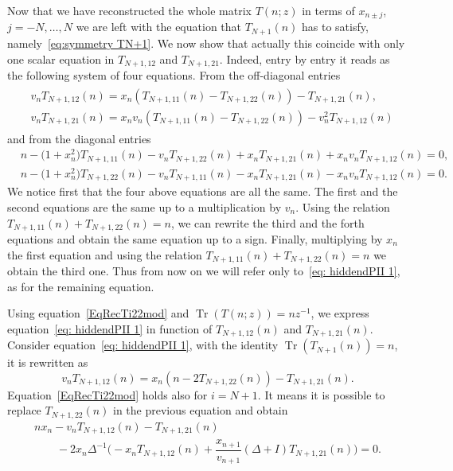 \documentclass[pdftex]{sigma}%
\numberwithin{equation}{section}
\DeclareMathOperator{\Tr}{Tr}
\begin{document}
	 Now that we have reconstructed the whole matrix $T(n;z)$ in terms of $x_{n\pm j}$, $j=-N,\dots,N$ we are left with the equation that $T_{N+1}(n)$ has to satisfy, namely~\eqref{eq:symmetry TN+1}. We now show that actually this coincide with only one scalar equation in $T_{N+1, 12}$ and $T_{N+1, 21}$.
	 Indeed, entry by entry it reads as the following system of four equations. From the off-diagonal entries
\begin{align}
\label{eq: hiddendPII 1}
\begin{split}
&v_{n}T_{N+1,12}(n)=x_n(T_{N+1,11}(n)-T_{N+1,22}(n))-T_{N+1,21}(n),
\\	
&v_{n}T_{N+1,21}(n)=x_nv_{n}(T_{N+1,11}(n)-T_{N+1,22}(n))-v_{n}^2T_{N+1,12}(n)
\end{split}
\end{align}
and from the diagonal entries
\begin{align} &n-\big(1+x_n^2\big)T_{N+1,11}(n)-v_{n}T_{N+1,22}(n)+x_nT_{N+1,21}(n)+x_nv_{n}T_{N+1,12}(n)=0,\nonumber\\
		&n-\big(1+x_n^2\big)T_{N+1,22}(n)-v_{n}T_{N+1,11}(n)-x_nT_{N+1,21}(n)-x_nv_{n}T_{N+1,12}(n)=0.\nonumber
	\end{align}
	We notice first that the four above equations are all the same. The first and the second equations are the same up to a multiplication by $v_n$. Using the relation $T_{N+1,11}(n)+T_{N+1,22}(n)=n$, we can rewrite the third and the forth equations and obtain the same equation up to a sign. Finally, multiplying by $x_n$ the first equation and using the relation $T_{N+1,11}(n)+T_{N+1,22}(n)=n$ we obtain the third one. Thus from now on we will refer only to~\eqref{eq: hiddendPII 1}, as for the remaining equation.
	
	Using equation~\eqref{EqRecTi22mod} and $\Tr(T(n;z))=nz^{-1}$, we express equation~\eqref{eq: hiddendPII 1} in function of $T_{N+1,12}(n)$ and $T_{N+1,21}(n)$.
	Consider equation~\eqref{eq: hiddendPII 1}, with the identity $\Tr(T_{N+1}(n))=n$, it is rewritten as
\begin{equation*}
v_nT_{N+1,12}(n)=x_n(n-2T_{N+1,22}(n))-T_{N+1,21}(n).
\end{equation*}
Equation~\eqref{EqRecTi22mod} holds also for $i=N+1$. It means it is possible to replace $T_{N+1,22}(n)$ in the previous equation and obtain
\begin{gather}
\label{eq:DPIINTN+112et21} nx_n-v_nT_{N+1,12}(n)-T_{N+1,21}(n)\nonumber
\\ \qquad
{}-2x_n\Delta^{-1}\biggl(-x_nT_{N+1,12}(n)+\dfrac{x_{n+1}}{v_{n+1}}(\Delta+I)T_{N+1,21}(n)\biggr)=0.
\end{gather}
		
\end{document}
